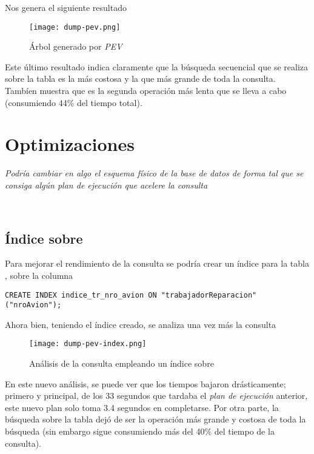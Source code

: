 Nos genera el siguiente resultado

\begin{figure}[H]
    \texttt{[image: dump-pev.png]}
    \caption{Árbol generado por \emph{PEV}}
\end{figure}

Este último resultado indica claramente que la búsqueda secuencial que se realiza sobre la tabla \emph{} es la más costosa y la que más grande de toda la consulta. Tambíen muestra que es la segunda operación más lenta que se lleva a cabo (consumiendo 44\% del tiempo total).



\section{Optimizaciones}
\emph{Podría cambiar en algo el esquema físico de la base de datos de forma tal que se consiga algún plan de ejecución que acelere la consulta}

~\\

\subsection{Índice sobre \emph{}}

Para mejorar el rendimiento de la consulta se podría crear un índice para la tabla \emph{}, sobre la columna \emph{}

\vspace*{5mm}
\begin{lstlisting}
CREATE INDEX indice_tr_nro_avion ON "trabajadorReparacion" ("nroAvion");
\end{lstlisting}

Ahora bien, teniendo el índice creado, se analiza una vez más la consulta

\begin{figure}[H]
    \texttt{[image: dump-pev-index.png]}
    \caption{Análisis de la consulta empleando un índice sobre \emph{}}
\end{figure}

En este nuevo análisis, se puede ver que los tiempos bajaron drásticamente; primero y principal, de los 33 segundos que tardaba el \emph{plan de ejecución} anterior, este nuevo plan solo toma 3.4 segundos en completarse. Por otra parte, la búsqueda sobre la tabla \emph{} dejó de ser la operación más grande y costosa de toda la búsqueda (sin embargo sigue consumiendo más del 40\% del tiempo de la consulta).

